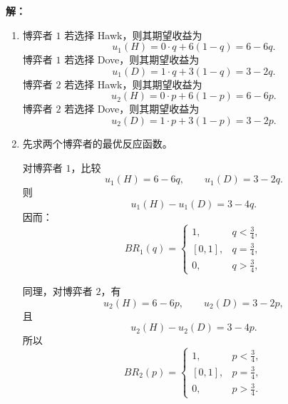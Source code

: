 \documentclass[12pt,a4paper]{article}
\begin{document}
\vspace{0.5cm}

\noindent\textbf{解：}
\begin{enumerate}[label=\alph*.]
  \item 博弈者 \(1\) 若选择 Hawk，则其期望收益为
  \[
    u_1(H)=0\cdot q+6(1-q)=6-6q.
  \]
  博弈者 \(1\) 若选择 Dove，则其期望收益为
  \[
    u_1(D)=1\cdot q+3(1-q)=3-2q.
  \]
  博弈者 \(2\) 若选择 Hawk，则其期望收益为
  \[
    u_2(H)=0\cdot p+6(1-p)=6-6p.
  \]
  博弈者 \(2\) 若选择 Dove，则其期望收益为
  \[
    u_2(D)=1\cdot p+3(1-p)=3-2p.
  \]

  \item 先求两个博弈者的最优反应函数。

  对博弈者 \(1\)，比较
  \[
    u_1(H)=6-6q,\qquad u_1(D)=3-2q.
  \]
  则
  \[
    u_1(H)-u_1(D)=3-4q.
  \]
  因而：
  \[
    BR_1(q)=
    \begin{cases}
      1, & q<\frac{3}{4},\\[4pt]
      [0,1], & q=\frac{3}{4},\\[4pt]
      0, & q>\frac{3}{4},
    \end{cases}
  \]

  同理，对博弈者 \(2\)，有
  \[
    u_2(H)=6-6p,\qquad u_2(D)=3-2p,
  \]
  且
  \[
    u_2(H)-u_2(D)=3-4p.
  \]
  所以
  \[
    BR_2(p)=
    \begin{cases}
      1, & p<\frac{3}{4},\\[4pt]
      [0,1], & p=\frac{3}{4},\\[4pt]
      0, & p>\frac{3}{4}.
    \end{cases}
  \]
  
  \begin{center}
\end{center}
\end{enumerate}
\end{document}
